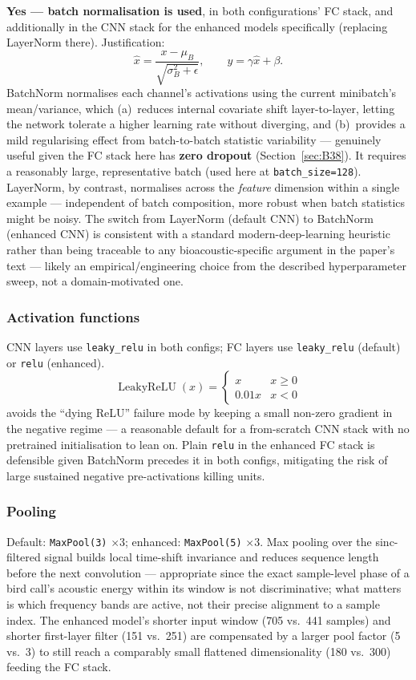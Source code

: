 \documentclass[11pt]{article}
\begin{document}
\textbf{Yes --- batch normalisation is used}, in both configurations' FC
stack, and additionally in the CNN stack for the enhanced models
specifically (replacing LayerNorm there). Justification:
\[
\hat x = \frac{x-\mu_B}{\sqrt{\sigma_B^2+\epsilon}}, \qquad y=\gamma\hat x+\beta .
\]
BatchNorm normalises each channel's activations using the current
minibatch's mean/variance, which (a)~reduces internal covariate shift
layer-to-layer, letting the network tolerate a higher learning rate without
diverging, and (b)~provides a mild regularising effect from batch-to-batch
statistic variability --- genuinely useful given the FC stack here has
\textbf{zero dropout} (Section~\ref{sec:B38}). It requires a reasonably
large, representative batch (used here at \texttt{batch\_size=128}). LayerNorm,
by contrast, normalises across the \emph{feature} dimension within a single
example --- independent of batch composition, more robust when batch
statistics might be noisy. The switch from LayerNorm (default CNN) to
BatchNorm (enhanced CNN) is consistent with a standard modern-deep-learning
heuristic rather than being traceable to any bioacoustic-specific argument
in the paper's text --- likely an empirical/engineering choice from the
described hyperparameter sweep, not a domain-motivated one.

\subsubsection{Activation functions}

CNN layers use \texttt{leaky\_relu} in both configs; FC layers use
\texttt{leaky\_relu} (default) or \texttt{relu} (enhanced).
\[
\operatorname{LeakyReLU}(x)=\begin{cases}x & x\ge0\\ 0.01x & x<0\end{cases}
\]
avoids the ``dying ReLU'' failure mode by keeping a small non-zero gradient
in the negative regime --- a reasonable default for a from-scratch CNN stack
with no pretrained initialisation to lean on. Plain \texttt{relu} in the
enhanced FC stack is defensible given BatchNorm precedes it in both configs,
mitigating the risk of large sustained negative pre-activations killing
units.

\subsubsection{Pooling}

Default: \texttt{MaxPool(3)} $\times 3$; enhanced: \texttt{MaxPool(5)}
$\times 3$. Max pooling over the sinc-filtered signal builds local
time-shift invariance and reduces sequence length before the next
convolution --- appropriate since the exact sample-level phase of a bird
call's acoustic energy within its window is not discriminative; what
matters is which frequency bands are active, not their precise alignment to
a sample index. The enhanced model's shorter input window (705 vs.\ 441
samples) and shorter first-layer filter (151 vs.\ 251) are compensated by a
larger pool factor (5 vs.\ 3) to still reach a comparably small flattened
dimensionality (180 vs.\ 300) feeding the FC stack.
\end{document}
